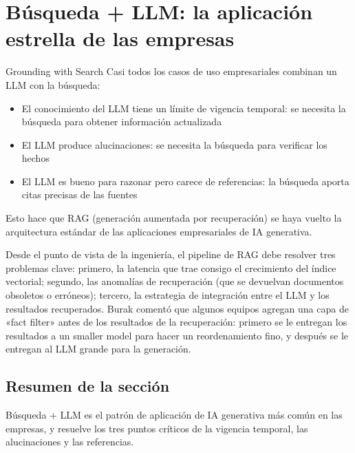 \section{Búsqueda + LLM: la aplicación estrella de las empresas}

\begin{importantbox}{Grounding with Search}
Casi todos los casos de uso empresariales combinan un LLM con la búsqueda:
\begin{itemize}
    \item El conocimiento del LLM tiene un límite de vigencia temporal: se necesita la búsqueda para obtener información actualizada
    \item El LLM produce alucinaciones: se necesita la búsqueda para verificar los hechos
    \item El LLM es bueno para razonar pero carece de referencias: la búsqueda aporta citas precisas de las fuentes
\end{itemize}
Esto hace que RAG (generación aumentada por recuperación) se haya vuelto la arquitectura estándar de las aplicaciones empresariales de IA generativa.
\end{importantbox}

Desde el punto de vista de la ingeniería, el pipeline de RAG debe resolver tres problemas clave: primero, la latencia que trae consigo el crecimiento del índice vectorial; segundo, las anomalías de recuperación (que se devuelvan documentos obsoletos o erróneos); tercero, la estrategia de integración entre el LLM y los resultados recuperados. Burak comentó que algunos equipos agregan una capa de «fact filter» antes de los resultados de la recuperación: primero se le entregan los resultados a un smaller model para hacer un reordenamiento fino, y después se le entregan al LLM grande para la generación.

\subsection{Resumen de la sección}

Búsqueda + LLM es el patrón de aplicación de IA generativa más común en las empresas, y resuelve los tres puntos críticos de la vigencia temporal, las alucinaciones y las referencias.

